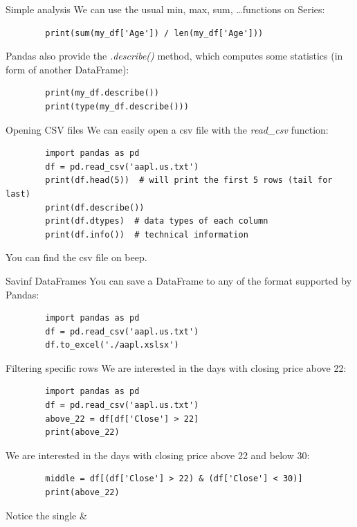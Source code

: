 \documentclass[aspectratio=169,handout]{beamer}
\begin{document}
\begin{frame}[fragile]{Simple analysis}
    We can use the usual min, max, sum, \ldots functions on Series:
    \begin{verbatim}
        print(sum(my_df['Age']) / len(my_df['Age']))
    \end{verbatim}

    Pandas also provide the \emph{.describe()} method, which computes some statistics (in form of another DataFrame):
    \begin{verbatim}
        print(my_df.describe())
        print(type(my_df.describe()))
    \end{verbatim}
\end{frame}

\begin{frame}[fragile]{Opening CSV files}
    We can easily open a csv file with the \emph{read\_csv} function:
    \begin{verbatim}
        import pandas as pd
        df = pd.read_csv('aapl.us.txt')
        print(df.head(5))  # will print the first 5 rows (tail for last)
        print(df.describe())
        print(df.dtypes)  # data types of each column
        print(df.info())  # technical information
    \end{verbatim}

    You can find the csv file on beep.
\end{frame}

\begin{frame}[fragile]{Savinf DataFrames}
    You can save a DataFrame to any of the format supported by Pandas:
    \begin{verbatim}
        import pandas as pd
        df = pd.read_csv('aapl.us.txt')
        df.to_excel('./aapl.xslsx')
    \end{verbatim}
\end{frame}

\begin{frame}[fragile]{Filtering specific rows}
    We are interested in the days with closing price above 22:
    \begin{verbatim}
        import pandas as pd
        df = pd.read_csv('aapl.us.txt')
        above_22 = df[df['Close'] > 22]
        print(above_22)
    \end{verbatim}

    We are interested in the days with closing price above 22 and below 30:
    \begin{verbatim}
        middle = df[(df['Close'] > 22) & (df['Close'] < 30)]
        print(above_22)
    \end{verbatim}

    Notice the single \&
\end{frame}
\end{document}
